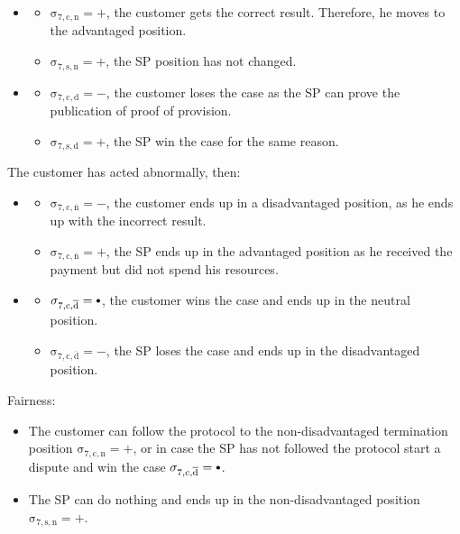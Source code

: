 \documentclass{ieeeaccess}
\newcommand\neutral[1][.75]{\mathbin{\ThisStyle{\vcenter{\hbox{%
  \scalebox{#1}{$\SavedStyle\bullet$}}}}}%
}
\begin{document}
\begin{itemize}
\item \AgreeablePath
  \begin{itemize}
    \item \(\operatorname{\sigma_{7, c, n} = +}\), the customer gets the correct result. Therefore, he moves to the advantaged position. 
    \item \(\operatorname{\sigma_{7, s, n} = +}\), the SP position has not changed. 
  \end{itemize}
\item \DisputePath
  \begin{itemize}
    \item \(\operatorname{\sigma_{7, c, d} = -}\), the customer loses the case as the SP can prove the publication of proof of provision. 
    \item \(\operatorname{\sigma_{7, s, d} = +}\), the SP win the case for the same reason.
  \end{itemize}
\end{itemize}

The customer has acted abnormally, then:

\begin{itemize}
\item \AgreeablePath
  \begin{itemize}
    \item \(\operatorname{\sigma_{7, c, \overline{n}} = -}\), the customer ends up in a disadvantaged position, as he ends up with the incorrect result.
    \item \(\operatorname{\sigma_{7, c, \overline{n}} = +}\), the SP ends up in the advantaged position as he received the payment but did not spend his resources.
  \end{itemize}
\item \DisputePath

  \begin{itemize}
  
  \item
    \(\operatorname{\sigma_{7, c, \overline{d}} = \neutral}\), the customer wins the case and ends up in the neutral position.
  \item
    \(\operatorname{\sigma_{7, c, \overline{d}} = -}\), the SP loses the case and ends up in the disadvantaged position.
  \end{itemize}
\end{itemize}

Fairness:

\begin{itemize}

\item
  The customer can follow the protocol to the non-disadvantaged termination position \(\operatorname{\sigma_{7, c, n} = +}\), or in case the SP has not followed the protocol start a dispute and win the case \(\operatorname{\sigma_{7, c, \overline{d}} = \neutral}\).
\item
  The SP can do nothing and ends up in the non-disadvantaged position \(\operatorname{\sigma_{7, s, n} = +}\).
\end{itemize}
\end{document}
